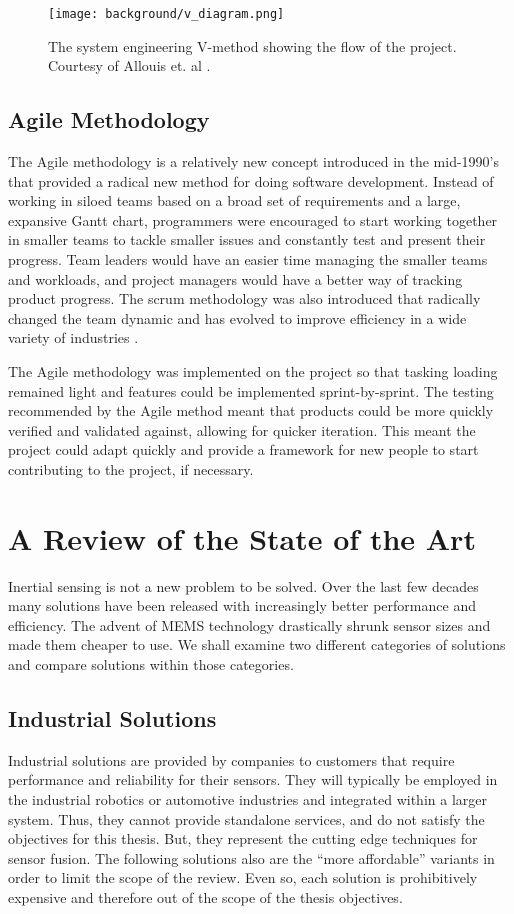 \begin{figure}
    \centering
    \caption[V-Method Diagram]{The system engineering V-method showing the flow of the project.
    Courtesy of Allouis et. al \cite{Allouis:2013}.}
    \texttt{[image: background/v\_diagram.png]}
\end{figure}

\subsection{Agile Methodology}
The Agile methodology is a relatively new concept introduced in the mid-1990's that provided a radical new method for doing software development.
Instead of working in siloed teams based on a broad set of requirements and a large, expansive Gantt chart, programmers were encouraged to start working together in smaller teams to tackle smaller issues and constantly test and present their progress.
Team leaders would have an easier time managing the smaller teams and workloads, and project managers would have a better way of tracking product progress.
The scrum methodology was also introduced that radically changed the team dynamic and has evolved to improve efficiency in a wide variety of industries \cite{Sutherland:2014}.

The Agile methodology was implemented on the project so that tasking loading remained light and features could be implemented sprint-by-sprint.
The testing recommended by the Agile method meant that products could be more quickly verified and validated against, allowing for quicker iteration.
This meant the project could adapt quickly and provide a framework for new people to start contributing to the project, if necessary.

\section{A Review of the State of the Art} 
Inertial sensing is not a new problem to be solved.
Over the last few decades many solutions have been released with increasingly better performance and efficiency.
The advent of MEMS technology drastically shrunk sensor sizes and made them cheaper to use.
We shall examine two different categories of solutions and compare solutions within those categories.

\subsection{Industrial Solutions} 
Industrial solutions are provided by companies to customers that require performance and reliability for their sensors.
They will typically be employed in the industrial robotics or automotive industries and integrated within a larger system.
Thus, they cannot provide standalone services, and do not satisfy the objectives for this thesis.
But, they represent the cutting edge techniques for sensor fusion.
The following solutions also are the ``more affordable'' variants in order to limit the scope of the review.
Even so, each solution is prohibitively expensive and therefore out of the scope of the thesis objectives.

